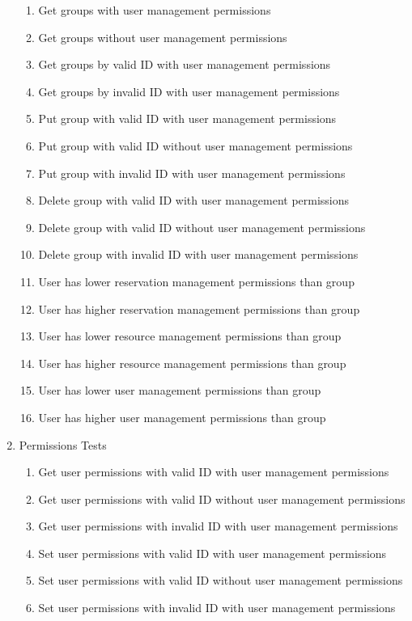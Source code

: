 \documentclass[12pt]{article}
\begin{document}
\begin{enumerate}
\begin{enumerate}
        \item Get groups with user management permissions
        \item Get groups without user management permissions
        \item Get groups by valid ID with user management permissions
        \item Get groups by invalid ID with user management permissions
        \item Put group with valid ID with user management permissions
        \item Put group with valid ID without user management permissions
        \item Put group with invalid ID with user management permissions
        \item Delete group with valid ID with user management permissions
        \item Delete group with valid ID without user management permissions
        \item Delete group with invalid ID with user management permissions
        \item User has lower reservation management permissions than group
        \item User has higher reservation management permissions than group
        \item User has lower resource management permissions than group
        \item User has higher resource management permissions than group
        \item User has lower user management permissions than group
        \item User has higher user management permissions than group
    \end{enumerate}
    \item Permissions Tests
    \begin{enumerate}
        \item Get user permissions with valid ID with user management permissions
        \item Get user permissions with valid ID without user management permissions
        \item Get user permissions with invalid ID with user management permissions
        \item Set user permissions with valid ID with user management permissions
        \item Set user permissions with valid ID without user management permissions
        \item Set user permissions with invalid ID with user management permissions 
    \end{enumerate}
\end{enumerate}
\end{document}
